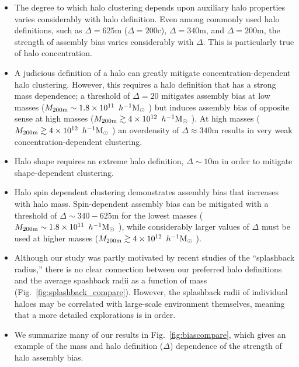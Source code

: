 \documentclass[usenatbib,fleqn]{mnras}
\begin{document}
\begin{itemize}
    
  	\item The degree to which halo clustering depends upon auxiliary halo properties varies considerably with halo definition. Even among commonly used halo definitions, such as $\Delta=625$m ($\Delta=200$c), $\Delta=340$m, and $\Delta=200$m, the strength of assembly bias varies considerably with $\Delta$. This is particularly true of halo concentration. 
    
    \item A judicious definition of a halo can greatly mitigate concentration-dependent halo clustering. However, this requires a halo definition that has a strong mass dependence; a threshold of $\Delta=20$ mitigates assembly bias at low masses 
($M_{200\text{m}} \sim 1.8 \times 10^{11}\, \ h^{-1}\mathrm{M}_{\odot}~$) but induces assembly bias of opposite sense at high masses 
($M_{200\text{m}} \gtrsim 4 \times 10^{12}\, \ h^{-1}\mathrm{M}_{\odot}~$). 
At high masses 
($M_{200\text{m}} \gtrsim 4 \times 10^{12}\, \ h^{-1}\mathrm{M}_{\odot}~$) 
an overdensity of $\Delta \approx 340$m results in 
very weak concentration-dependent clustering. 
    
    \item Halo shape requires an extreme halo definition, $\Delta \sim 10$m in order to mitigate shape-dependent clustering.
    
    \item Halo spin dependent clustering demonstrates assembly bias that increases with halo mass. Spin-dependent assembly bias can be mitigated with a threshold of 
$\Delta \sim 340-625$m for the lowest masses ($M_{200\text{m}} \sim 1.8 \times10^{11}\, \ h^{-1}\mathrm{M}_{\odot}~$), while considerably larger values of $\Delta$ must be used at higher masses 
($M_{200\text{m}} \gtrsim 4 \times 10^{12}\, \ h^{-1}\mathrm{M}_{\odot}~$). 

    \item Although our study was partly motivated by recent studies of the ``splashback radius,'' there is no clear connection between our preferred halo definitions and the average spashback radii as a function of mass (Fig.~\ref{fig:splashback_compare}). However, the splashback radii of individual haloes may be correlated with large-scale environment themselves, meaning that a more detailed explorations is in order.
    
    \item We summarize many of our results in Fig.~\ref{fig:biascompare}, which gives an example of the mass and halo definition ($\Delta$) dependence of the strength of halo assembly bias.
    
\end{itemize}
\end{document}
